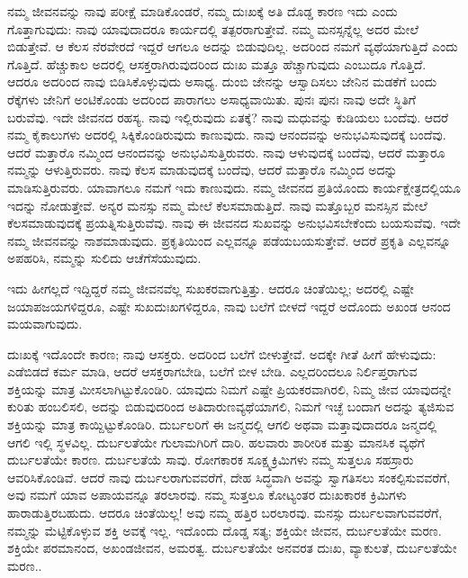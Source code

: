 ನಮ್ಮ ಜೀವನವನ್ನು ನಾವು ಪರೀಕ್ಷೆ ಮಾಡಿಕೊಂಡರೆ, ನಮ್ಮ ದುಃಖಕ್ಕೆ ಅತಿ ದೊಡ್ಡ ಕಾರಣ ಇದು ಎಂದು ಗೊತ್ತಾಗುವುದು: ನಾವು ಯಾವುದಾದರೂ ಕಾರ್ಯದಲ್ಲಿ ತತ್ಪರರಾಗುತ್ತೇವೆ. ನಮ್ಮ ಮನಸ್ಸನ್ನೆಲ್ಲ ಅದರ ಮೇಲೆ ಬಿಡುತ್ತೇವೆ. ಆ ಕೆಲಸ ನೆರವೇರದೆ ಇದ್ದರೆ ಆಗಲೂ ಅದನ್ನು ಬಿಡುವುದಿಲ್ಲ. ಅದರಿಂದ ನಮಗೆ ವ್ಯಥೆಯಾಗುತ್ತಿದೆ ಎಂದು ಗೊತ್ತಿದೆ. ಹೆಚ್ಚುಕಾಲ ಅದರಲ್ಲಿ ಆಸಕ್ತರಾಗಿರುವುದರಿಂದ ದುಃಖ ಮತ್ತೂ ಹೆಚ್ಚಾಗುವುದು ಎಂಬುದೂ ಗೊತ್ತಿದೆ. ಆದರೂ ಅದರಿಂದ ನಾವು ಬಿಡಿಸಿಕೊಳ್ಳುವುದು ಅಸಾಧ್ಯ. ದುಂಬಿ ಜೇನನ್ನು ಆಸ್ವಾದಿಸಲು ಜೇನಿನ ಮಡಕೆಗೆ ಬಂದು ರೆಕ್ಕೆಗಳು ಜೇನಿಗೆ ಅಂಟಿಕೊಂಡು ಅದರಿಂದ ಪಾರಾಗಲು ಅಸಾಧ್ಯವಾಯಿತು. ಪುನಃ ಪುನಃ ನಾವು ಅದೇ ಸ್ಥಿತಿಗೆ ಬರುವೆವು. ಇದೇ ಜೀವನದ ರಹಸ್ಯ. ನಾವು ಇಲ್ಲಿರುವುದು ಏತಕ್ಕೆ? ನಾವು ಮಧುವನ್ನು ಕುಡಿಯಲು ಬಂದೆವು. ಆದರೆ ನಮ್ಮ ಕೈಕಾಲುಗಳು ಅದರಲ್ಲಿ ಸಿಕ್ಕಿಕೊಂಡಿರುವುದು ಕಾಣುವುದು. ನಾವು ಆನಂದವನ್ನು ಅನುಭವಿಸುವುದಕ್ಕೆ ಬಂದೆವು. ಆದರೆ ಮತ್ತಾರೊ ನಮ್ಮಿಂದ ಆನಂದವನ್ನು ಅನುಭವಿಸುತ್ತಿರುವರು. ನಾವು ಆಳುವುದಕ್ಕೆ ಬಂದೆವು, ಆದರೆ ಮತ್ತಾರೂ ನಮ್ಮನ್ನು ಆಳುತ್ತಿರುವರು. ನಾವು ಕೆಲಸ ಮಾಡುವುದಕ್ಕೆ ಬಂದೆವು, ಆದರೆ ಮತ್ತಾರೊ ನಮ್ಮಿಂದ ಅದನ್ನು ಮಾಡಿಸುತ್ತಿರುವರು. ಯಾವಾಗಲೂ ನಮಗೆ ಇದು ಕಾಣುವುದು. ನಮ್ಮ ಜೀವನದ ಪ್ರತಿಯೊಂದು ಕಾರ್ಯಕ್ಷೇತ್ರದಲ್ಲಿಯೂ ಇದನ್ನು ನೋಡುತ್ತೇವೆ. ಅನ್ಯರ ಮನಸ್ಸು ನಮ್ಮ ಮೇಲೆ ಕೆಲಸಮಾಡುತ್ತಿದೆ. ನಾವು ಮತ್ತೊಬ್ಬರ ಮನಸ್ಸಿನ ಮೇಲೆ ಕೆಲಸಮಾಡುವುದಕ್ಕೆ ಪ್ರಯತ್ನಿಸುತ್ತಿರುವೆವು. ನಾವು ಈ ಜೀವನದ ಸುಖವನ್ನು ಅನುಭವಿಸಬೇಕೆಂದು ಬಯಸುವೆವು. ಇದೇ ನಮ್ಮ ಜೀವನವನ್ನು ನಾಶಮಾಡುವುದು. ಪ್ರಕೃತಿಯಿಂದ ಎಲ್ಲವನ್ನೂ ಪಡೆಯಬಯಸುತ್ತೇವೆ. ಆದರೆ ಪ್ರಕೃತಿ ಎಲ್ಲವನ್ನೂ ಅಪಹರಿಸಿ, ನಮ್ಮನ್ನು ಸುಲಿದು ಆಚೆಗೆಸೆಯುವುದು.

ಇದು ಹೀಗಲ್ಲದೆ ಇದ್ದಿದ್ದರೆ ನಮ್ಮ ಜೀವನವೆಲ್ಲ ಸುಖಕರವಾಗುತ್ತಿತ್ತು. ಆದರೂ ಚಿಂತೆಯಿಲ್ಲ; ಅದರಲ್ಲಿ ಎಷ್ಟೇ ಜಯಾಪಜಯಗಳಿದ್ದರೂ, ಎಷ್ಟೇ ಸುಖದುಃಖಗಳಿದ್ದರೂ, ನಾವು ಬಲೆಗೆ ಬೀಳದೆ ಇದ್ದರೆ ಅದೊಂದು ಅಖಂಡ ಆನಂದ ಮಯವಾಗುವುದು.

ದುಃಖಕ್ಕೆ ಇದೊಂದೇ ಕಾರಣ; ನಾವು ಆಸಕ್ತರು. ಅದರಿಂದ ಬಲೆಗೆ ಬೀಳುತ್ತೇವೆ. ಅದಕ್ಕೇ ಗೀತೆ ಹೀಗೆ ಹೇಳುವುದು: ಎಡೆಬಿಡದೆ ಕರ್ಮ ಮಾಡಿ, ಆದರೆ ಆಸಕ್ತರಾಗಬೇಡಿ, ಬಲೆಗೆ ಬೀಳ ಬೇಡಿ. ಎಲ್ಲದರಿಂದಲೂ ನಿರ್ಲಿಪ್ತರಾಗುವ ಶಕ್ತಿಯನ್ನು ಮಾತ್ರ ಮೀಸಲಾಗಿಟ್ಟುಕೊಂಡಿರಿ. ಯಾವುದು ನಿಮಗೆ ಎಷ್ಟೇ ಪ್ರಿಯಕರವಾಗಿರಲಿ, ನಿಮ್ಮ ಜೀವ ಯಾವುದನ್ನೇ ಕುರಿತು ಹಂಬಲಿಸಲಿ, ಅದನ್ನು ಬಿಡುವುದರಿಂದ ಅತಿದಾರುಣ\break ವ್ಯಥೆಯಾಗಲಿ, ನಿಮಗೆ ಇಚ್ಛೆ ಬಂದಾಗ ಅದನ್ನು ತ್ಯಜಿಸುವ ಶಕ್ತಿಯನ್ನು ಮಾತ್ರ ಕಾಯ್ದಿಟ್ಟುಕೊಂಡಿರಿ. ದುರ್ಬಲರಿಗೆ ಈ ಜನ್ಮದಲ್ಲಿ ಆಗಲಿ ಅಥವಾ ಮತ್ತಾವುದಾದರೂ ಜನ್ಮದಲ್ಲಿ ಆಗಲಿ ಇಲ್ಲಿ ಸ್ಥಳವಿಲ್ಲ. ದುರ್ಬಲತೆಯೇ ಗುಲಾಮಗಿರಿಗೆ ದಾರಿ. ಹಲವಾರು ಶಾರೀರಿಕ ಮತ್ತು ಮಾನಸಿಕ ವ್ಯಥೆಗೆ ದುರ್ಬಲತೆಯೇ ಕಾರಣ. ದುರ್ಬಲತೆಯೆ ಸಾವು. ರೋಗಕಾರಕ ಸೂಕ್ಷ್ಮಕ್ರಿಮಿಗಳು ನಮ್ಮ ಸುತ್ತಲೂ ಸಹಸ್ರಾರು ಆವರಿಸಿಕೊಂಡಿವೆ. ಆದರೆ ನಾವು ದುರ್ಬಲರಾಗುವವರೆಗೆ, ದೇಹ ಸಿದ್ಧವಾಗಿ ಅವನ್ನು ಸ್ವಾಗತಿಸಲು ಸಂಕಲ್ಪಿಸುವವರೆಗೆ, ಅವು ನಮಗೆ ಯಾವ ಅಪಾಯವನ್ನೂ ತರಲಾರವು. ನಮ್ಮ ಸುತ್ತಲೂ ಕೋಟ್ಯಂತರ ದುಃಖಕಾರಕ ಕ್ರಿಮಿಗಳು ಹಾರಾಡುತ್ತಿರಬಹುದು. ಆದರೂ ಚಿಂತೆಯಿಲ್ಲ! ಅವು ನಮ್ಮ ಹತ್ತಿರ ಬರಲಾರವು. ಮನಸ್ಸು ದುರ್ಬಲವಾಗುವವರೆಗೆ, ನಮ್ಮನ್ನು ಮೆಟ್ಟಿಕೊಳ್ಳುವ ಶಕ್ತಿ ಅವಕ್ಕೆ ಇಲ್ಲ. ಇದೊಂದು ದೊಡ್ಡ ಸತ್ಯ; ಶಕ್ತಿಯೇ ಜೀವನ, ದುರ್ಬಲತೆಯೇ ಮರಣ. ಶಕ್ತಿಯೇ ಪರಮಾನಂದ, ಅಖಂಡಜೀವನ, ಅಮರತ್ವ. ದುರ್ಬಲತೆಯೇ ಅನವರತ ದುಃಖ, ವ್ಯಾಕುಲತೆ, ದುರ್ಬಲತೆಯೇ ಮರಣ..

